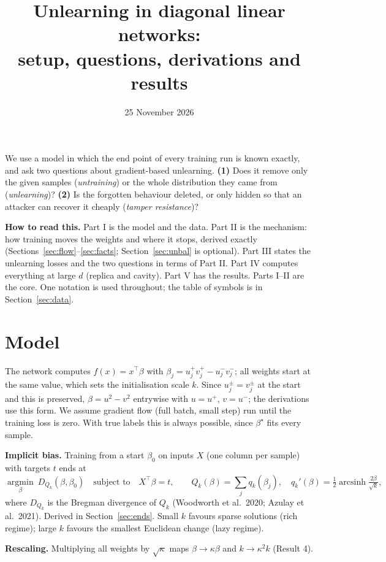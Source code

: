 \documentclass[10pt]{article}
\title{Unlearning in diagonal linear networks:\\ setup, questions, derivations and results}
\author{}\date{25 November 2026}
\newcommand{\Part}[2]{\clearpage{\LARGE\bfseries Part #1.\ #2\par}\bigskip}
\begin{document}
\maketitle
We use a model in which the end point of every training run is known exactly, and ask two questions about gradient-based unlearning.
\textbf{(1)} Does it remove only the given samples (\emph{untraining}) or the whole distribution they came from (\emph{unlearning})?
\textbf{(2)} Is the forgotten behaviour deleted, or only hidden so that an attacker can recover it cheaply (\emph{tamper resistance})?

\textbf{How to read this.} Part I is the model and the data. Part II is the mechanism: how training moves the weights and where it stops, derived exactly (Sections~\ref{sec:flow}--\ref{sec:facts}; Section~\ref{sec:unbal} is optional). Part III states the unlearning losses and the two questions in terms of Part II. Part IV computes everything at large $d$ (replica and cavity). Part V has the results. Parts I--II are the core. One notation is used throughout; the table of symbols is in Section~\ref{sec:data}.
\tableofcontents

\Part{I}{Model and data}
\section{Model}
The network computes $f(x)=x^\top\beta$ with $\beta_j=u_j^+v_j^+-u_j^-v_j^-$; all weights start at the same value, which sets the initialisation scale $k$. Since $u_j^\pm=v_j^\pm$ at the start and this is preserved, $\beta=u^2-v^2$ entrywise with $u=u^+$, $v=u^-$; the derivations use this form. We assume gradient flow (full batch, small step) run until the training loss is zero. With true labels this is always possible, since $\beta^\star$ fits every sample.

\textbf{Implicit bias.} Training from a start $\beta_0$ on inputs $X$ (one column per sample) with targets $t$ ends at
\[
\operatorname*{argmin}_\beta\ D_{Q_k}(\beta,\beta_0)\quad\text{subject to}\quad X^\top\beta=t,
\qquad Q_k(\beta)=\textstyle\sum_jq_k(\beta_j),\quad q_k'(\beta)=\tfrac12\operatorname{arcsinh}\tfrac{2\beta}{\sqrt k},
\]
where $D_{Q_k}$ is the Bregman divergence of $Q_k$ (Woodworth et al.\ 2020; Azulay et al.\ 2021). Derived in Section~\ref{sec:ends}. Small $k$ favours sparse solutions (rich regime); large $k$ favours the smallest Euclidean change (lazy regime).

\textbf{Rescaling.} Multiplying all weights by $\sqrt\kappa$ maps $\beta\to\kappa\beta$ and $k\to\kappa^2k$ (Result 4).
\end{document}
